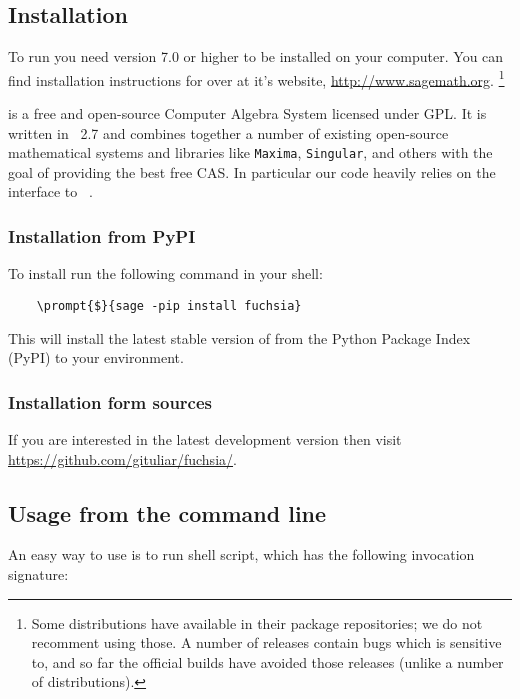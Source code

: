 \documentclass[12pt,a4paper]{article}
\begin{document}
\subsection{Installation}

To run \fuchsia you need \sage version 7.0 or higher to be installed on your computer.
You can find installation instructions for \sage over at it's website, \url{http://www.sagemath.org}.
\footnote{
    Some \linux distributions have \sage available in their package repositories; we do not recomment using those.
    A number of \maxima releases contain bugs which \fuchsia is sensitive to, and so far the official \sage builds have avoided those releases (unlike a number of \linux distributions).
}

\sage is a free and open-source Computer Algebra System licensed under GPL.
It is written in \python~2.7 and combines together a number of existing open-source mathematical systems and libraries like \texttt{Maxima}, \texttt{Singular}, and others with the goal of providing the best free CAS.
In particular our code heavily relies on the interface to \maxima~\cite{maxima}.

\subsubsection{Installation from PyPI}

To install \fuchsia run the following command in your shell:

\begin{Verbatim}
    \prompt{$}{sage -pip install fuchsia}
\end{Verbatim}

This will install the latest stable version of \fuchsia from the Python Package Index (PyPI) to your \sage environment.

\subsubsection{Installation form sources}

If you are interested in the latest development version then visit \url{https://github.com/gituliar/fuchsia/}.

\subsection{Usage from the command line}

An easy way to use \fuchsia is to run  shell script, which has the following invocation signature:
\end{document}

